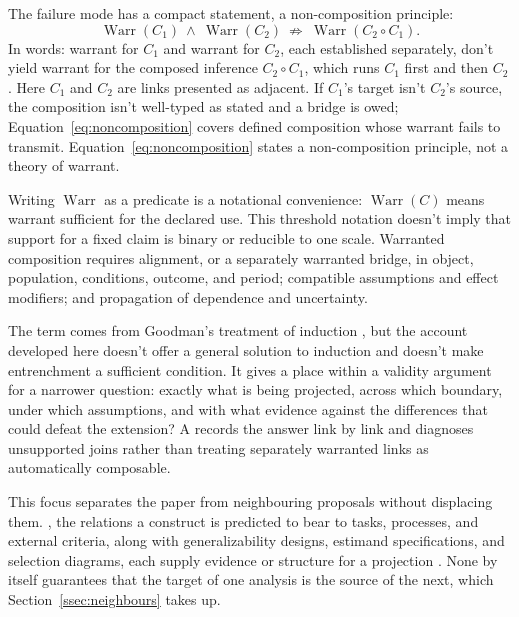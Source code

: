 \documentclass[12pt]{article}
\newcommand{\Warr}{\operatorname{Warr}}
\begin{document}
The failure mode has a compact statement, a non-composition principle:
\begin{equation}\label{eq:noncomposition}
\Warr(C_1)\ \land\ \Warr(C_2)
\ \not\Rightarrow\
\Warr(C_2\!\circ C_1).
\end{equation}
In words: warrant for \(C_1\) and warrant for \(C_2\), each established separately, don't yield warrant for the composed inference \(C_2\!\circ C_1\), which runs \(C_1\) first and then \(C_2\). Here \(C_1\) and \(C_2\) are links presented as adjacent. If \(C_1\)'s target isn't \(C_2\)'s source, the composition isn't well-typed as stated and a bridge is owed; Equation~\ref{eq:noncomposition} covers defined composition whose warrant fails to transmit. Equation~\ref{eq:noncomposition} states a non-composition principle, not a theory of warrant.

Writing \(\Warr\) as a predicate is a notational convenience: \(\Warr(C)\) means warrant sufficient for the declared use. This threshold notation doesn't imply that support for a fixed claim is binary or reducible to one scale. Warranted composition requires alignment, or a separately warranted bridge, in object, population, conditions, outcome, and period; compatible assumptions and effect modifiers; and propagation of dependence and uncertainty.

The term  comes from Goodman's treatment of induction \citeyearpar{goodman1983}, but the account developed here doesn't offer a general solution to induction and doesn't make entrenchment a sufficient condition. It gives a place within a validity argument for a narrower question: exactly what is being projected, across which boundary, under which assumptions, and with what evidence against the differences that could defeat the extension? A  records the answer link by link and diagnoses unsupported joins rather than treating separately warranted links as automatically composable.

This focus separates the paper from neighbouring proposals without displacing them. , the relations a construct is predicted to bear to tasks, processes, and external criteria, along with generalizability designs, estimand specifications, and selection diagrams, each supply evidence or structure for a projection \citep{cronbach1955construct,freiesleben2026establishing,brennan2001generalizability,binetteReiter2024estimands,pearlBareinboim2014transportability}. None by itself guarantees that the target of one analysis is the source of the next, which Section~\ref{ssec:neighbours} takes up.
\end{document}
